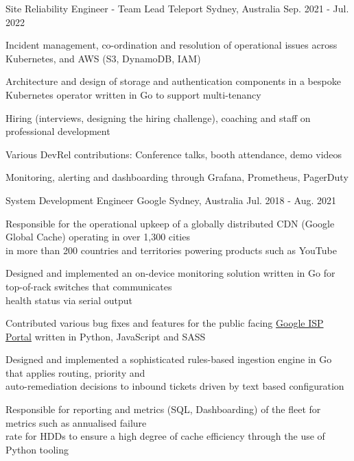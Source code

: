 \begin{cventries}
  \cventry
    {Site Reliability Engineer - Team Lead} %
    {Teleport} %
    {Sydney, Australia} %
    {Sep. 2021 - Jul. 2022} %
    {
      \begin{cvitems} %
      \item {Incident management, co-ordination and resolution of operational issues across Kubernetes, and AWS (S3, DynamoDB, IAM)}
        \item {Architecture and design of storage and authentication components in a bespoke Kubernetes operator written in Go to support multi-tenancy}
        \item {Hiring (interviews, designing the hiring challenge), coaching and staff on professional development}
        \item {Various DevRel contributions: Conference talks, booth attendance, demo videos }
        \item {Monitoring, alerting and dashboarding through Grafana, Prometheus, PagerDuty}
      \end{cvitems}
    }


  \cventry
    {System Development Engineer} %
    {Google} %
    {Sydney, Australia} %
    {Jul. 2018 - Aug. 2021} %
    {
      \begin{cvitems} %
        \item {Responsible for the operational upkeep of a globally distributed CDN (Google Global Cache) operating in over 1,300 cities\\
         in more than 200 countries and territories powering products such as YouTube}
        \item {Designed and implemented an on-device monitoring solution written in Go for top-of-rack switches that communicates\\
         health status via serial output }
        \item {Contributed various bug fixes and features for the public facing \href{https://peering.google.com/}{Google ISP Portal} written in Python, JavaScript and SASS}
        \item {Designed and implemented a sophisticated rules-based ingestion engine in Go that applies routing, priority and\\
         auto-remediation decisions to inbound tickets driven by text based configuration}
        \item {Responsible for reporting and metrics (SQL, Dashboarding) of the fleet for metrics such as annualised failure\\
         rate for HDDs to ensure a high degree of cache efficiency through the use of Python tooling}
      \end{cvitems}
    }



\end{cventries}
